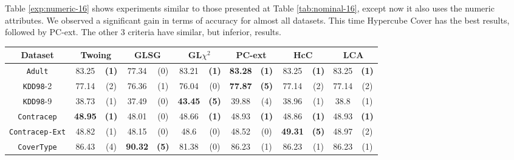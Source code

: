 Table \ref{exp:numeric-16} shows experiments  similar to those presented at Table \ref{tab:nominal-16}, except now it also uses the numeric attributes. We observed a significant gain in terms of accuracy for almost all datasets. This time Hypercube Cover has the best results, followed by PC-ext. The other 3 criteria have similar, but inferior, results.

\begin{table}
\scriptsize
\centering
\begin{tabular}{c|cc|cc|cc|cc|cc|cc} 
Dataset              &        \multicolumn{2}{c|}{Twoing} &   \multicolumn{2}{c|}{GLSG} &   \multicolumn{2}{c|}{GL$\chi^2$} & \multicolumn{2}{c|}{PC-ext}  & \multicolumn{2}{c|}{HcC}  & \multicolumn{2}{c}{LCA}  \\
\hline   
{\tt Adult}          &  83.25         &  {\bf (1)}        &  77.34      &  (0)          &  83.21       &  {\bf (1)}         & {\bf 83.28} & {\bf (1)}      & 83.25        & {\bf (1)} & 83.25        & {\bf (1)} \\
{\tt KDD98}-2        &  77.14         &  (2)              &  76.36      &  (1)          &  76.04       &  (0)               & {\bf 77.87} & {\bf (5)}      & 77.14        & (2)       & 77.14        & (2)       \\
{\tt KDD98}-9        &  38.73         &  (1)              &  37.49      &  (0)          &  {\bf 43.45} &  {\bf (5)}         &  39.88      & (4)            & 38.96        & (1)       & 38.8         & (1)       \\
{\tt Contracep}      &  {\bf 48.95}   &  {\bf (1)}        &  48.01      &  (0)          &  48.66       &  {\bf (1)}         &  48.93      & {\bf (1)}      & 48.86        & {\bf (1)} & 48.93        & {\bf (1)} \\
{\tt Contracep-Ext}  &  48.82         &  (1)              &  48.15      &  (0)          &  48.6        &  (0)               &  48.52      & (0)            & {\bf 49.31 } & {\bf (5)} & 48.97        & (2)       \\
{\tt CoverType}      &  86.43         &  (4)              &  {\bf 90.32}&  {\bf (5)}    &  81.38       &  (0)               &  86.23      & (1)            & 86.23        & (1)       & 86.23        & (1)       \\

\end{tabular}
\end{table}
